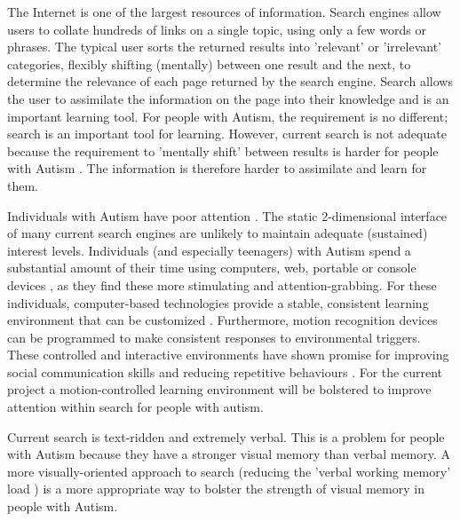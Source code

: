 \documentclass[a4paper, 10pt]{article}
\begin{document}
The Internet is one of the largest resources of information. Search engines allow users to collate hundreds of links on a single topic, using only a few words or phrases. The typical user sorts the returned results into 'relevant' or 'irrelevant' categories, flexibly shifting (mentally) between one result and the next, to determine the relevance of each page returned by the search engine. Search allows the user to assimilate the information on the page into their knowledge and is an important learning tool. For people with Autism, the requirement is no different; search is an important tool for learning. However, current search is not adequate because the requirement to 'mentally shift' between results is harder for people with Autism \cite{disengagement}. The information is therefore harder to assimilate and learn for them. 

Individuals with Autism have poor attention \cite{attention}. The static 2-dimensional interface of many current search engines are unlikely to maintain adequate (sustained) interest levels. Individuals (and especially teenagers) with Autism spend a substantial amount of their time using computers, web, portable or console devices \cite{Shane and Albert}, as they find these more stimulating and attention-grabbing. For these individuals, computer-based technologies provide a stable, consistent learning environment that can be customized \cite{moore}. Furthermore, motion recognition devices can be programmed to make consistent responses to environmental triggers. These controlled and interactive environments have shown promise for improving social communication skills and reducing repetitive behaviours \cite{gameshealth}. For the current project a motion-controlled learning environment will be bolstered to improve attention within search for people with autism. 

Current search is text-ridden and extremely verbal. This is a problem for people with Autism because they have a stronger visual memory \cite{fabienne} than verbal memory. A more visually-oriented approach to search (reducing the 'verbal working memory' load \cite{workingmem}) is a more appropriate way to bolster the strength of visual memory in people with Autism.
\end{document}
